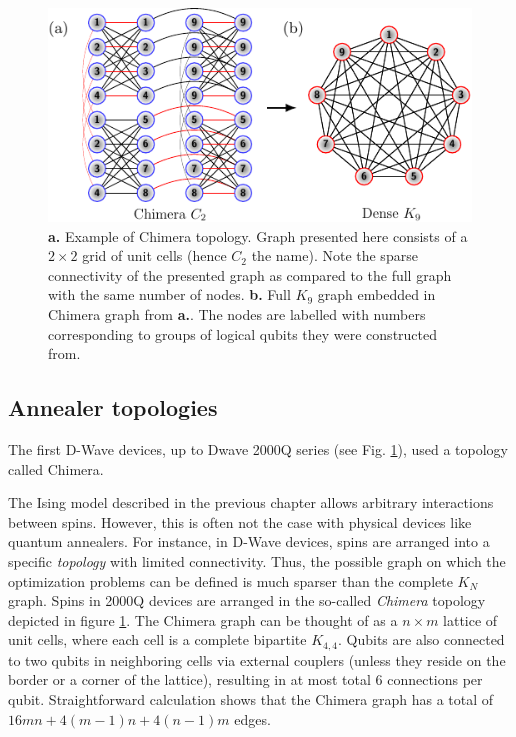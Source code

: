 \begin{figure}
    \centering
    \includegraphics[width=\textwidth]{figures/chimera.pdf}
    \caption{\textbf{a.} Example of Chimera topology. Graph presented here consists of a $2 \times 2$ grid of unit cells (hence $C_2$ the name). Note the sparse connectivity of the presented graph as compared to the full graph with the same number of nodes. \textbf{b.} Full $K_9$ graph embedded in Chimera graph from \textbf{a.}. The nodes are labelled with numbers corresponding to groups of logical qubits they were constructed from.}
    \label{fig:chimera}
\end{figure}

\subsection{Annealer topologies}

The first D-Wave devices, up to Dwave 2000Q series (see Fig. \ref{fig:chimera}), used a topology
called Chimera.

The Ising model described in the previous chapter allows arbitrary interactions between spins. However, this is often not the case with physical devices like quantum annealers. For instance, in D-Wave devices, spins are arranged into a specific \emph{topology} with limited connectivity. Thus, the possible graph on which the optimization problems can be defined is much sparser than the complete $K_{N}$ graph. Spins in 2000Q devices are arranged in the so-called \emph{Chimera} topology depicted in figure \ref{fig:chimera}. The Chimera graph can be thought of as a $n \times m$ lattice of unit cells, where each cell is a complete bipartite $K_{4,4}$. Qubits are also connected to two qubits in neighboring cells via external couplers (unless they reside on the border or a corner of the lattice), resulting in at most total 6 connections per qubit. Straightforward calculation shows that the Chimera graph has a total of $16mn + 4(m-1)n + 4(n-1)m$ edges.

